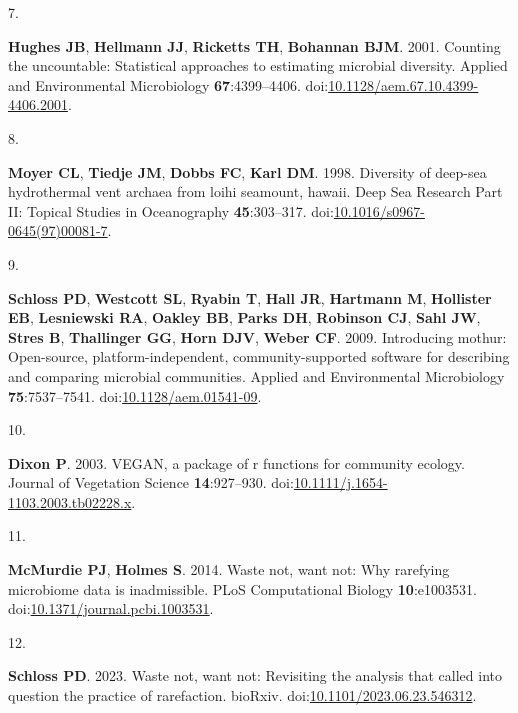 \documentclass[
]{article}
\newlength{\cslhangindent}
\newlength{\csllabelwidth}
\newlength{\cslentryspacingunit} %
\newenvironment{CSLReferences}[2] %
 {%
  \setlength{\parindent}{0pt}
  \ifodd #1
  \let\oldpar\par
  \def\par{\hangindent=\cslhangindent\oldpar}
  \fi
  \setlength{\parskip}{#2\cslentryspacingunit}
 }%
 {}
\newcommand{\CSLLeftMargin}[1]{\parbox[t]{\csllabelwidth}{#1}}
\newcommand{\CSLRightInline}[1]{\parbox[t]{\linewidth - \csllabelwidth}{#1}\break}
\begin{document}
\begin{CSLReferences}{0}{1}
\leavevmode{}%
\CSLLeftMargin{7. }%
\CSLRightInline{\textbf{Hughes JB}, \textbf{Hellmann JJ},
\textbf{Ricketts TH}, \textbf{Bohannan BJM}. 2001. Counting the
uncountable: Statistical approaches to estimating microbial diversity.
Applied and Environmental Microbiology \textbf{67}:4399--4406.
doi:\href{https://doi.org/10.1128/aem.67.10.4399-4406.2001}{10.1128/aem.67.10.4399-4406.2001}.}

\leavevmode{}%
\CSLLeftMargin{8. }%
\CSLRightInline{\textbf{Moyer CL}, \textbf{Tiedje JM}, \textbf{Dobbs
FC}, \textbf{Karl DM}. 1998. Diversity of deep-sea hydrothermal vent
archaea from loihi seamount, hawaii. Deep Sea Research Part {II}:
Topical Studies in Oceanography \textbf{45}:303--317.
doi:\href{https://doi.org/10.1016/s0967-0645(97)00081-7}{10.1016/s0967-0645(97)00081-7}.}

\leavevmode{}%
\CSLLeftMargin{9. }%
\CSLRightInline{\textbf{Schloss PD}, \textbf{Westcott SL},
\textbf{Ryabin T}, \textbf{Hall JR}, \textbf{Hartmann M},
\textbf{Hollister EB}, \textbf{Lesniewski RA}, \textbf{Oakley BB},
\textbf{Parks DH}, \textbf{Robinson CJ}, \textbf{Sahl JW}, \textbf{Stres
B}, \textbf{Thallinger GG}, \textbf{Horn DJV}, \textbf{Weber CF}. 2009.
Introducing mothur: Open-source, platform-independent,
community-supported software for describing and comparing microbial
communities. Applied and Environmental Microbiology
\textbf{75}:7537--7541.
doi:\href{https://doi.org/10.1128/aem.01541-09}{10.1128/aem.01541-09}.}

\leavevmode{}%
\CSLLeftMargin{10. }%
\CSLRightInline{\textbf{Dixon P}. 2003. {VEGAN}, a package of r
functions for community ecology. Journal of Vegetation Science
\textbf{14}:927--930.
doi:\href{https://doi.org/10.1111/j.1654-1103.2003.tb02228.x}{10.1111/j.1654-1103.2003.tb02228.x}.}

\leavevmode{}%
\CSLLeftMargin{11. }%
\CSLRightInline{\textbf{McMurdie PJ}, \textbf{Holmes S}. 2014. Waste
not, want not: Why rarefying microbiome data is inadmissible. {PLoS}
Computational Biology \textbf{10}:e1003531.
doi:\href{https://doi.org/10.1371/journal.pcbi.1003531}{10.1371/journal.pcbi.1003531}.}

\leavevmode{}%
\CSLLeftMargin{12. }%
\CSLRightInline{\textbf{Schloss PD}. 2023. Waste not, want not:
Revisiting the analysis that called into question the practice of
rarefaction. bio{R}xiv.
doi:\href{https://doi.org/10.1101/2023.06.23.546312}{10.1101/2023.06.23.546312}.}


\end{CSLReferences}
\end{document}
